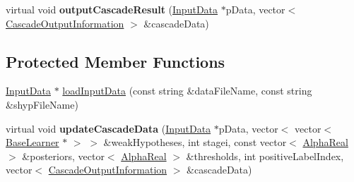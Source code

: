 \begin{DoxyCompactItemize}
\item 
\hypertarget{classMultiBoost_1_1VJCascadeClassifier_aa7b624190b92da1f3556f7bc8e3fdc29}{virtual void {\bfseries output\-Cascade\-Result} (\hyperlink{classMultiBoost_1_1InputData}{Input\-Data} $\ast$p\-Data, vector$<$ \hyperlink{structMultiBoost_1_1CascadeOutputInformation}{Cascade\-Output\-Information} $>$ \&cascade\-Data)}\label{classMultiBoost_1_1VJCascadeClassifier_aa7b624190b92da1f3556f7bc8e3fdc29}

\end{DoxyCompactItemize}
\subsection*{Protected Member Functions}
\begin{DoxyCompactItemize}
\item 
\hyperlink{classMultiBoost_1_1InputData}{Input\-Data} $\ast$ \hyperlink{classMultiBoost_1_1VJCascadeClassifier_a5662bdd86974ffa41e442d78adbfcf50}{load\-Input\-Data} (const string \&data\-File\-Name, const string \&shyp\-File\-Name)
\item 
\hypertarget{classMultiBoost_1_1VJCascadeClassifier_a765c55e33eb08889d5d93fc2f06161f8}{virtual void {\bfseries update\-Cascade\-Data} (\hyperlink{classMultiBoost_1_1InputData}{Input\-Data} $\ast$p\-Data, vector$<$ vector$<$ \hyperlink{classMultiBoost_1_1BaseLearner}{Base\-Learner} $\ast$ $>$ $>$ \&weak\-Hypotheses, int stagei, const vector$<$ \hyperlink{Defaults_8h_a80184c4fd10ab70a1a17c5f97dcd1563}{Alpha\-Real} $>$ \&posteriors, vector$<$ \hyperlink{Defaults_8h_a80184c4fd10ab70a1a17c5f97dcd1563}{Alpha\-Real} $>$ \&thresholds, int positive\-Label\-Index, vector$<$ \hyperlink{structMultiBoost_1_1CascadeOutputInformation}{Cascade\-Output\-Information} $>$ \&cascade\-Data)}\label{classMultiBoost_1_1VJCascadeClassifier_a765c55e33eb08889d5d93fc2f06161f8}

\end{DoxyCompactItemize}

